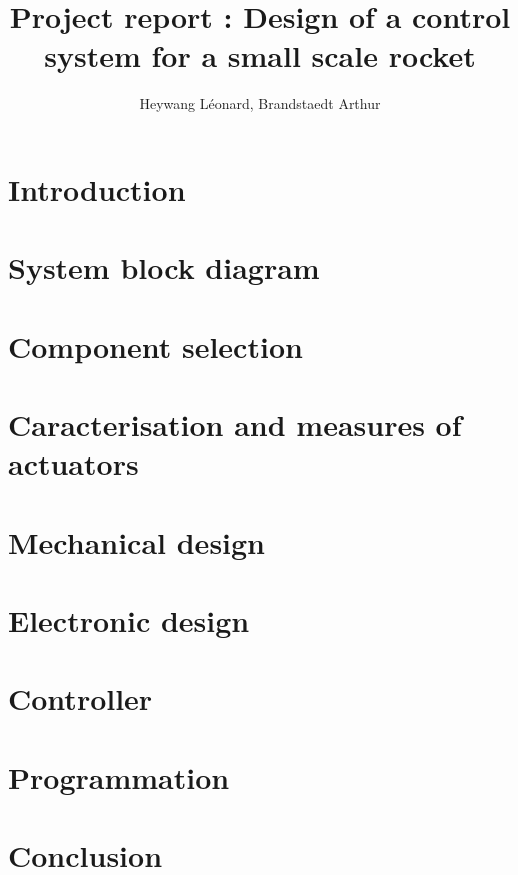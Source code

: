 \documentclass[twoside]{report}
\author{Heywang Léonard, Brandstaedt Arthur}
\title{Project report : Design of a control system for a small scale rocket}
\date{\DTMtoday}
\begin{document}



\tableofcontents
\listoffigures
\listoftables

\newpage
\chapter{Introduction}

\chapter{System block diagram}


\chapter{Component selection}


\chapter{Caracterisation and measures of actuators}


\chapter{Mechanical design}


\chapter{Electronic design}


\chapter{Controller}


\chapter{Programmation}


\chapter{Conclusion}


\printbibliography

\newpage
\appendix
\end{document}

